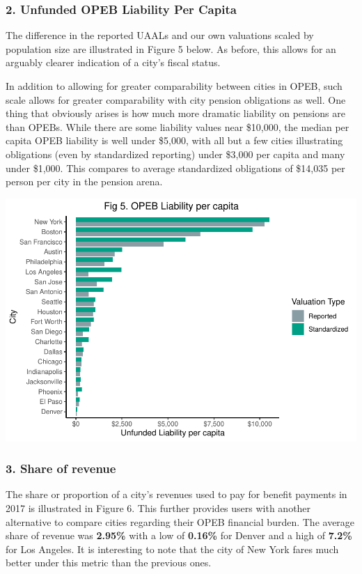 \documentclass[
]{article}
\begin{document}
\hypertarget{unfunded-opeb-liability-per-capita}{%
\subsubsection{2. Unfunded OPEB Liability Per
Capita}\label{unfunded-opeb-liability-per-capita}}

The difference in the reported UAALs and our own valuations scaled by
population size are illustrated in Figure 5 below. As before, this
allows for an arguably clearer indication of a city's fiscal status.

In addition to allowing for greater comparability between cities in
OPEB, such scale allows for greater comparability with city pension
obligations as well. One thing that obviously arises is how much more
dramatic liability on pensions are than OPEBs. While there are some
liability values near \$10,000, the median per capita OPEB liability is
well under \$5,000, with all but a few cities illustrating obligations
(even by standardized reporting) under \$3,000 per capita and many under
\$1,000. This compares to average standardized obligations of \$14,035
per person per city in the pension arena.

\includegraphics{City-Solvency-Report--Adjusted-_files/figure-latex/unnamed-chunk-10-1.pdf}

\hypertarget{share-of-revenue-1}{%
\subsubsection{3. Share of revenue}\label{share-of-revenue-1}}

The share or proportion of a city's revenues used to pay for benefit
payments in 2017 is illustrated in Figure 6. This further provides users
with another alternative to compare cities regarding their OPEB
financial burden. The average share of revenue was \textbf{2.95\%} with
a low of \textbf{0.16\%} for Denver and a high of \textbf{7.2\%} for Los
Angeles. It is interesting to note that the city of New York fares much
better under this metric than the previous ones.
\end{document}
